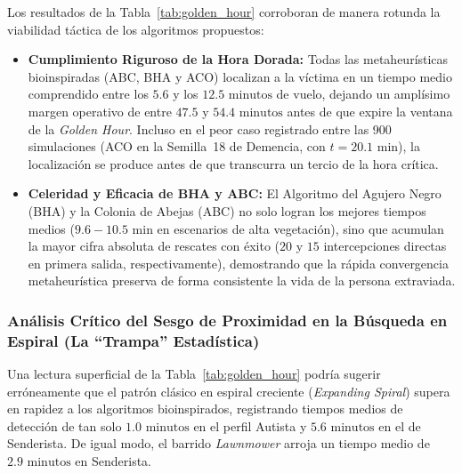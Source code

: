 Los resultados de la Tabla~\ref{tab:golden_hour} corroboran de manera rotunda la viabilidad táctica de los algoritmos propuestos:
\begin{itemize}
    \item \textbf{Cumplimiento Riguroso de la Hora Dorada:} Todas las metaheurísticas bioinspiradas (ABC, BHA y ACO) localizan a la víctima en un tiempo medio comprendido entre los $5.6$ y los $12.5\text{ minutos}$ de vuelo, dejando un amplísimo margen operativo de entre $47.5$ y $54.4\text{ minutos}$ antes de que expire la ventana de la \textit{Golden Hour}. Incluso en el peor caso registrado entre las 900 simulaciones (ACO en la Semilla~18 de Demencia, con $t = 20.1\text{ min}$), la localización se produce antes de que transcurra un tercio de la hora crítica.
    \item \textbf{Celeridad y Eficacia de BHA y ABC:} El Algoritmo del Agujero Negro (BHA) y la Colonia de Abejas (ABC) no solo logran los mejores tiempos medios ($9.6 - 10.5\text{ min}$ en escenarios de alta vegetación), sino que acumulan la mayor cifra absoluta de rescates con éxito ($20$ y $15$ intercepciones directas en primera salida, respectivamente), demostrando que la rápida convergencia metaheurística preserva de forma consistente la vida de la persona extraviada.
\end{itemize}

\subsubsection{Análisis Crítico del Sesgo de Proximidad en la Búsqueda en Espiral (La ``Trampa'' Estadística)}

Una lectura superficial de la Tabla~\ref{tab:golden_hour} podría sugerir erróneamente que el patrón clásico en espiral creciente (\textit{Expanding Spiral}) supera en rapidez a los algoritmos bioinspirados, registrando tiempos medios de detección de tan solo $1.0\text{ minutos}$ en el perfil Autista y $5.6\text{ minutos}$ en el de Senderista. De igual modo, el barrido \textit{Lawnmower} arroja un tiempo medio de $2.9\text{ minutos}$ en Senderista.

